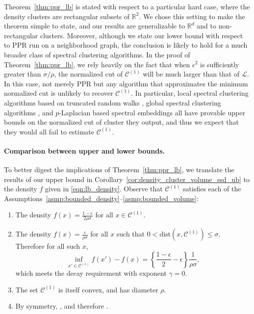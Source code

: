 \documentclass[11pt,twoside]{article}
\newcommand{\Reals}{\mathbb{R}}
\newcommand{\1}{\mathbf{1}}
\newcommand{\mc}[1]{\mathcal{#1}}
\newcommand{\Pbb}{\mathbb{P}}
\newcommand{\dist}{\mathrm{dist}}
\newcommand{\vol}{\mathrm{vol}}
\begin{document}
Theorem~\ref{thm:ppr_lb} is stated with respect to a particular hard case, where
the density clusters are rectangular subsets of $\Reals^2$.  We chose this
setting to make the theorem simple to state, and our results are generalizable
to $\Reals^d$ and to non-rectangular clusters.  Moreover, although we state
our lower bound with respect to PPR run on a neighborhood graph, the conclusion is
likely to hold for a much broader class of spectral clustering algorithms. In
the proof of Theorem~\ref{thm:ppr_lb}, we rely heavily on the fact that when
$\epsilon^2$ is sufficiently greater than $\sigma/\rho$, the normalized cut of
$\mc{C}^{(1)}$ will be much larger than that of $\mathcal{L}$. In this case, not
merely PPR but any algorithm that approximates the minimum normalized cut is
unlikely to recover $\mc{C}^{(1)}$. In particular, local spectral clustering
algorithms based on truncated random walks \citep{spielman2013}, global spectral
clustering algorithms \citep{shi00}, and $p$-Laplacian based spectral embeddings
\citep{hein2010} all have provable upper bounds on the normalized cut of cluster
they output, and thus we expect that they would all fail to estimate
$\mc{C}^{(1)}$.

\paragraph{Comparison between upper and lower bounds.}

To better digest the implications of Theorem~\ref{thm:ppr_lb}, we translate the
results of our upper bound in Corollary~\ref{cor:density_cluster_volume_ssd_ub} to the density $f$ given in \eqref{eqn:lb_density}. Observe that $\mc{C}^{(1)}$ satisfies each of the Assumptions~\ref{asmp:bounded_density}--\ref{asmp:bounded_volume}:

\begin{enumerate}[label=(A\arabic*)]
	\item The density $f(x) = \frac{1 - \epsilon}{2 \rho \sigma}$ for all $x \in
	\mc{C}^{(1)}$.  
	\item The density $f(x) = \frac{\epsilon}{\rho\sigma}$ for all $x$ such
	that $0 < \dist(x,\mc{C}^{(1)}) \leq \sigma$. Therefore for all such $x$, 
	$$
	\inf_{x' \in \mc{C}^{(1)}} f(x') - f(x)  = \left\{\frac{1 - \epsilon}{2} -
	\epsilon \right\} \frac{1}{\rho \sigma},
	$$
	which meets the decay requirement with exponent $\gamma=0$.
	\item The set $\mc{C}^{(1)}$ is itself convex, and has diameter $\rho$.
	\item By symmetry, \smash{$\vol_{\Pbb,r}(\mc{C}^{(1)}) =
		\vol_{\Pbb,r}(\mc{C}^{(2)})$}, and therefore
	\smash{$\vol_{\Pbb,r}(\mc{C}^{(1)}) \leq \frac{1}{2}\vol_{\Pbb,r}(\Reals^d)$}.   
\end{enumerate}
\end{document}
